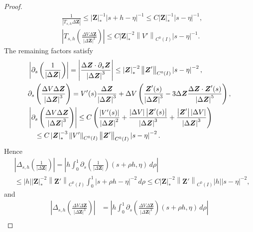 \documentclass[11pt,reqno]{amsart}
\theoremstyle{plain}
\theoremstyle{definition}
\numberwithin{equation}{section}
\newcommand{\paren}[1]{\left(#1\right)}
\newcommand{\p}{\partial}
\newcommand{\bm}[1]{\boldsymbol{#1}}
\newcommand{\abs}[1]{\left\lvert #1 \right\rvert}
\newcommand{\norm}[1]{\left\lVert #1 \right\rVert}
\newcommand{\ci}[1]{C^{#1}(I)}
\begin{document}
\begin{proof}
\begin{align}
    &\frac{1}{\abs{T_{s,h}\Delta\bm Z}} \le \abs{\bm Z}_*^{-1}\abs{s+h-\eta}^{-1} \le C\abs{\bm Z}_*^{-1} \abs{s-\eta}^{-1},\\
    &\abs{T_{s,h}\paren{\frac{ \Delta V\Delta\bm Z}{\abs{\Delta\bm Z}^3}}} \le C\abs{\bm Z}_*^{-2}\norm{V'}_{\ci{0}} \abs{s-\eta}^{-1}.
\end{align}
The remaining factors satisfy
\begin{align}
    &\abs{\partial_s\paren{\frac{1}{\abs{\Delta \bm Z}}} }=\abs{ \frac{\Delta \bm Z\cdot\p_s\bm
    Z}{\abs{\Delta\bm Z}^3} }\le \abs{\bm Z}_*^{-2}\norm{\bm Z'}_{\ci{0}}\abs{s-\eta}^{-2}, \\
    &\p_s\paren{\frac{ \Delta V\Delta\bm Z}{\abs{\Delta\bm Z}^3}} = V'(s) \frac{\Delta\bm Z}{\abs{\Delta\bm
    Z}^3} + \Delta V \paren{\frac{\bm Z'(s)}{\abs{\Delta\bm Z}^3} -3 \Delta\bm Z \frac{\Delta\bm Z\cdot\bm
    Z'(s)}{\abs{\Delta\bm Z}^5} }, \\
    &\abs{\p_s\paren{\frac{ \Delta V\Delta\bm Z}{\abs{\Delta\bm Z}^3}} } \le
    C\paren{\frac{\abs{V'(s)}}{\abs{\Delta\bm Z}^2} + \frac{\abs{\Delta V}\abs{\bm Z'(s)}}{\abs{\Delta\bm Z}^3}
    + \frac{\abs{\bm Z'}\abs{\Delta V}}{\abs{\Delta\bm Z}^3} }\notag \\
    &\quad \le C\abs{\bm Z}_*^{-3}\norm{V'}_{\ci{0}}\norm{\bm Z'}_{\ci{0}}\abs{s-\eta}^{-2}.
\end{align}
Hence
\begin{equation}
\begin{aligned}
    &\abs{\Delta_{s,h}\paren{\frac{1}{\abs{\Delta\bm Z}}}} = \abs{ h \int_0^1 \partial_s \paren{\frac{1}{\abs{\Delta \bm Z}}}(s+\rho h,\eta) \,d\rho }\\
    &\le \abs{h}\abs{\bm Z}_*^{-2}\norm{\bm Z'}_{\ci{0}}
    \int_0^1 \abs{s+\rho h-\eta}^{-2} \,d\rho  \le C \abs{\bm Z}_*^{-2}\norm{\bm Z'}_{\ci{0}} \abs{h}\abs{s-\eta}^{-2},
\end{aligned}
\end{equation}
and
\begin{equation}
\begin{aligned}
    \abs{\Delta_{s,h}\paren{\frac{ \Delta V\Delta\bm Z}{\abs{\Delta\bm Z}^3}}} &= \abs{h\int_0^1
    \p_s\paren{\frac{ \Delta V\Delta\bm Z}{\abs{\Delta\bm Z}^3}} (s+\rho h,\eta) \,d\rho }  \\

\end{aligned}
\end{equation}
\end{proof}
\end{document}
